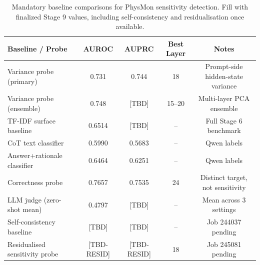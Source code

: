 \begin{table}[t]
\centering
\caption{Mandatory baseline comparisons for PhysMon sensitivity detection. Fill with finalized Stage 9 values, including self-consistency and residualisation once available.}
\label{tab:baselines}
\begin{tabular}{lcccc}
\toprule
Baseline / Probe & AUROC & AUPRC & Best Layer & Notes \\
\midrule
Variance probe (primary) & 0.731 & 0.744 & 18 & Prompt-side hidden-state variance \\
Variance probe (ensemble) & 0.748 & [TBD] & 15--20 & Multi-layer PCA ensemble \\
TF-IDF surface baseline & 0.6514 & [TBD] & -- & Full Stage 6 benchmark \\
CoT text classifier & 0.5990 & 0.5683 & -- & Qwen labels \\
Answer+rationale classifier & 0.6464 & 0.6251 & -- & Qwen labels \\
Correctness probe & 0.7657 & 0.7535 & 24 & Distinct target, not sensitivity \\
LLM judge (zero-shot mean) & 0.4797 & [TBD] & -- & Mean across 3 settings \\
Self-consistency baseline & [TBD] & [TBD] & -- & Job 244037 pending \\
Residualised sensitivity probe & [TBD-RESID] & [TBD-RESID] & 18 & Job 245081 pending \\
\bottomrule
\end{tabular}
\end{table}
